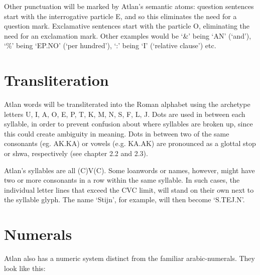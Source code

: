 Other punctuation will be marked by Atlan’s semantic atoms: question sentences start with the interrogative particle E, and so this eliminates the need for a question mark. Exclamative sentences start with the particle O, eliminating the need for an exclamation mark. Other examples would be ‘\&’ being ‘AN’ (‘and’), ‘\%’ being ‘EP.NO’ (‘per hundred’), ‘:’ being ‘I’ (‘relative clause’) etc. 

\section{Transliteration}
Atlan words will be transliterated into the Roman alphabet using the archetype letters U, I, A, O, E, P, T, K, M, N, S, F, L, J. Dots are used in between each syllable, in order to prevent confusion about where syllables are broken up, since this could create ambiguity in meaning. Dots in between two of the same consonants (eg. AK.KA) or vowels (e.g. KA.AK) are pronounced as a glottal stop or shwa, respectively (see chapter 2.2 and 2.3). 

Atlan’s syllables are all (C)V(C). Some loanwords or names, however, might have two or more consonants in a row within the same syllable. In such cases, the individual letter lines that exceed the CVC limit, will stand on their own next to the syllable glyph. The name ‘Stijn’, for example, will then become ‘S.TEJ.N’. 

\section{Numerals}

Atlan also has a numeric system distinct from the familiar arabic-numerals. They look like this:
\pagebreak

\setlength{\columnsep}{10pt}

